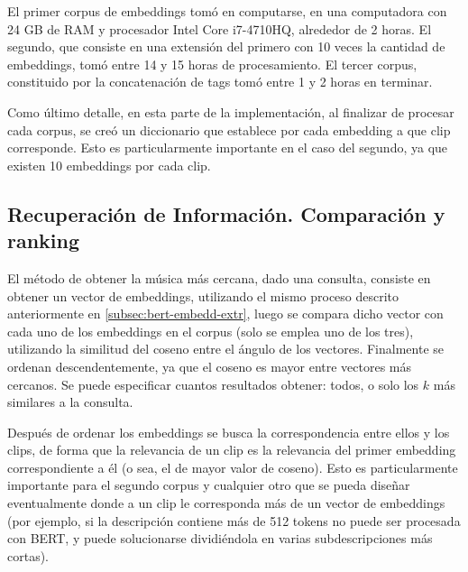 El primer corpus de embeddings tomó en computarse, en una computadora con 24 GB de RAM y procesador Intel Core i7-4710HQ, alrededor de 2 horas. El segundo, que consiste en una extensión del primero con 10 veces la cantidad de embeddings, tomó entre 14 y 15 horas de procesamiento. El tercer corpus, constituido por la concatenación de tags tomó entre 1 y 2 horas en terminar.

Como último detalle, en esta parte de la implementación, al finalizar de procesar cada corpus, se creó un diccionario que establece por cada embedding a que clip corresponde. Esto es particularmente importante en el caso del segundo, ya que existen 10 embeddings por cada clip.

\subsection{Recuperación de Información. Comparación y ranking}
\label{subsec:IR-process-query}

El método de obtener la música más cercana, dado una consulta, consiste en obtener un vector de embeddings, utilizando el mismo proceso descrito anteriormente en  \ref{subsec:bert-embedd-extr}, luego se compara dicho vector con cada uno de los embeddings en el corpus (solo se emplea uno de los tres), utilizando la similitud del coseno entre el ángulo de los vectores. Finalmente se ordenan descendentemente, ya que el coseno es mayor entre vectores más cercanos. Se puede especificar cuantos resultados obtener: todos, o solo los $k$ más similares a la consulta. 

Después de ordenar los embeddings se busca la correspondencia entre ellos y los clips, de forma que la relevancia de un clip es la relevancia del primer embedding correspondiente a él (o sea, el de mayor valor de coseno). Esto es particularmente importante para el segundo corpus y cualquier otro que se pueda diseñar eventualmente donde a un clip le corresponda más de un vector de embeddings (por ejemplo, si la descripción contiene más de 512 tokens no puede ser procesada con BERT, y puede solucionarse dividiéndola en varias subdescripciones más cortas).

